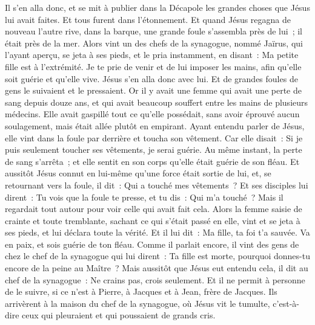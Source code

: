 \begin{multicols}{2}
Il s'en alla donc, et se mit à publier dans la Décapole les grandes choses que Jésus lui avait faites. Et tous furent dans l'étonnement.
Et quand Jésus regagna de nouveau l'autre rive, dans la barque, une grande foule s'assembla près de lui~; il était près de la mer.
Alors vint un des chefs de la synagogue, nommé Jaïrus, qui l'ayant aperçu, se jeta à ses pieds,
et le pria instamment, en disant~: Ma petite fille est à l'extrémité. Je te prie de venir et de lui imposer les mains, afin qu'elle soit guérie et qu'elle vive.
Jésus s'en alla donc avec lui. Et de grandes foules de gens le suivaient et le pressaient.
Or il y avait une femme qui avait une perte de sang depuis douze ans,
et qui avait beaucoup souffert entre les mains de plusieurs médecins. Elle avait gaspillé tout ce qu'elle possédait, sans avoir éprouvé aucun soulagement, mais était allée plutôt en empirant.
Ayant entendu parler de Jésus, elle vint dans la foule par derrière et toucha son vêtement.
Car elle disait~: Si je puis seulement toucher ses vêtements, je serai guérie.
Au même instant, la perte de sang s'arrêta~; et elle sentit en son corps qu'elle était guérie de son fléau.
Et aussitôt Jésus connut en lui-même qu'une force était sortie de lui, et, se retournant vers la foule, il dit~: Qui a touché mes vêtements~?
Et ses disciples lui dirent~: Tu vois que la foule te presse, et tu dis~: Qui m'a touché~?
Mais il regardait tout autour pour voir celle qui avait fait cela.
Alors la femme saisie de crainte et toute tremblante, sachant ce qui s'était passé en elle, vint et se jeta à ses pieds, et lui déclara toute la vérité.
Et il lui dit~: Ma fille, ta foi t'a sauvée. Va en paix, et sois guérie de ton fléau.
Comme il parlait encore, il vint des gens de chez le chef de la synagogue qui lui dirent~: Ta fille est morte, pourquoi donnes-tu encore de la peine au Maître~?
Mais aussitôt que Jésus eut entendu cela, il dit au chef de la synagogue~: Ne crains pas, crois seulement.
Et il ne permit à personne de le suivre, si ce n'est à Pierre, à Jacques et à Jean, frère de Jacques.
Ils arrivèrent à la maison du chef de la synagogue, où Jésus vit le tumulte, c'est-à-dire ceux qui pleuraient et qui poussaient de grands cris.

\end{multicols}
